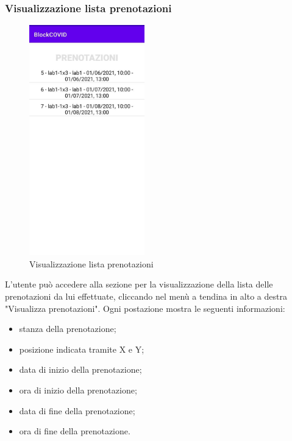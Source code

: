 	\subsubsection{Visualizzazione lista prenotazioni}
	\begin{figure}[H]
		\centering
		\includegraphics[width=5cm]{res/images/VisualizzaPrenotazioni.png}
		\caption{Visualizzazione lista prenotazioni}
	\end{figure}
	L’utente può accedere alla sezione per la visualizzazione della lista delle prenotazioni da lui effettuate, cliccando nel menù a tendina in alto a destra "Visualizza prenotazioni".
	Ogni postazione mostra le seguenti informazioni:
	\begin{itemize}
		\item stanza della prenotazione;
		\item posizione indicata tramite X e Y;
		\item data di inizio della prenotazione;
		\item ora di inizio della prenotazione;
		\item data di fine della prenotazione;
		\item ora di fine della prenotazione.
	\end{itemize}
